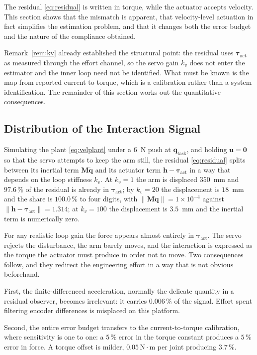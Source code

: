 \documentclass{ieeeaccess}
\newcommand{\norm}[1]{\left\| #1 \right\|}
\newcommand{\tauact}{\bm{\tau}_{\mathrm{act}}}
\begin{document}
The residual \eqref{eq:residual} is written in torque, while the actuator accepts
velocity. This section shows that the mismatch is apparent, that velocity-level
actuation in fact simplifies the estimation problem, and that it changes both the
error budget and the nature of the compliance obtained.

Remark~\ref{rem:kv} already established the structural point: the residual uses
$\tauact$ as measured through the effort channel, so the servo gain $k_v$ does not
enter the estimator and the inner loop need not be identified. What must be known
is the map from reported current to torque, which is a calibration rather than a
system identification. The remainder of this section works out the quantitative
consequences.

\subsection{Distribution of the Interaction Signal}
\label{sec:velocity-signal}
Simulating the plant \eqref{eq:velplant} under a $6$~N push at
$\bm q_{\text{task}}$, and holding $\bm u=\bm 0$ so that the servo attempts to
keep the arm still, the residual \eqref{eq:residual} splits between its inertial
term $\bm M\ddot{\bm q}$ and its actuator term $\bm h-\tauact$ in a way that
depends on the loop stiffness $k_v$. At $k_v=1$ the arm is displaced $350$~mm and
$97.6\,\%$ of the residual is already in $\tauact$; by $k_v=20$ the displacement
is $18$~mm and the share is $100.0\,\%$ to four digits, with
$\norm{\bm M\ddot{\bm q}}=1\times10^{-4}$ against
$\norm{\bm h-\tauact}=1.314$; at $k_v=100$ the displacement is $3.5$~mm and the
inertial term is numerically zero.

For any realistic loop gain the force appears almost entirely in $\tauact$. The
servo rejects the disturbance, the arm barely moves, and the interaction is
expressed as the torque the actuator must produce in order not to move. Two
consequences follow, and they redirect the engineering effort in a way that is not
obvious beforehand.

First, the finite-differenced acceleration, normally the delicate quantity in a
residual observer, becomes irrelevant: it carries $0.006\,\%$ of the signal.
Effort spent filtering encoder differences is misplaced on this platform.

Second, the entire error budget transfers to the current-to-torque calibration,
where sensitivity is one to one: a $5\,\%$ error in the torque constant produces a
$5\,\%$ error in force. A torque offset is milder, $0.05\,\mathrm{N}\cdot\mathrm{m}$
per joint producing $3.7\,\%$.
\end{document}
